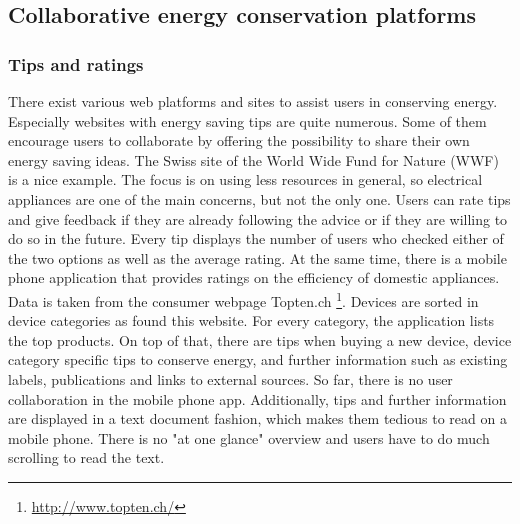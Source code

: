 \subsection{Collaborative energy conservation platforms}
\subsubsection{Tips and ratings}
There exist various web platforms and sites to assist users in conserving energy. Especially websites with energy saving tips are quite numerous. Some of them encourage users to collaborate by offering the possibility to share their own energy saving ideas. The Swiss site of the World Wide Fund for Nature (WWF)~\cite{wwf} is a nice example. The focus is on using less resources in general, so electrical appliances are one of the main concerns, but not the only one. Users can rate tips and give feedback if they are already following the advice or if they are willing to do so in the future. Every tip displays the number of users who checked either of the two options as well as the average rating. At the same time, there is a mobile phone application that provides ratings on the efficiency of domestic appliances. Data is taken from the consumer webpage Topten.ch \footnote{\url{http://www.topten.ch/}}. Devices are sorted in device categories as found this website. For every category, the application lists the top products. On top of that, there are tips when buying a new device, device category specific tips to conserve energy, and further information such as existing labels, publications and links to external sources. So far, there is no user collaboration in the mobile phone app. Additionally, tips and further information are displayed in a text document fashion, which makes them tedious to read on a mobile phone. There is no "at one glance" overview and users have to do much scrolling to read the text.   

